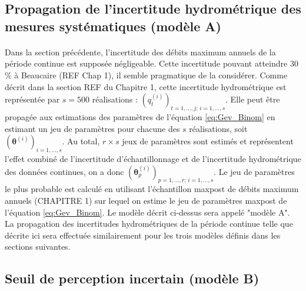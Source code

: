 \documentclass[11pt]{article}
\begin{document}
	

	
	\subsection{Propagation de l'incertitude hydrométrique des mesures systématiques (modèle A)}
	\label{subsec:modA}
	
	\paragraph{}
	Dans la section précédente, l'incertitude des débits maximum annuels de la période continue est supposée négligeable. Cette incertitude pouvant atteindre 30 \% à Beaucaire (REF Chap 1), il semble pragmatique de la considérer. Comme décrit dans la section REF du Chapitre 1, cette incertitude hydrométrique est représentée par $s = 500$ réalisations : $(q_t^{(i)})_{t=1,...,j;\,i=1,...,s}$. Elle peut être propagée aux estimations des paramètres de l'équation \ref{eq:Gev_Binom} en estimant un jeu de paramètres pour chacune des $s$ réalisations, soit $(\boldsymbol{\theta}
	^{(i)})_{i=1,...,s}$. Au total, $r \times s$ jeux de paramètres sont estimés et représentent l'effet combiné de l'incertitude d'échantillonnage et de l'incertitude hydrométrique des données continues, on a donc $(\boldsymbol{\theta}^{(i)}_p)_{p=1,...,r;\, i=1,...,s}$. Le jeu de paramètres le plus probable est calculé en utilisant l'échantillon maxpost de débits maximum annuels (CHAPITRE 1) sur lequel on estime le jeu de paramètres maxpost de l'équation \ref{eq:Gev_Binom}. Le modèle décrit ci-dessus sera appelé "modèle A". La propagation des incertitudes hydrométriques de la période continue telle que décrite ici sera effectuée similairement pour les trois modèles définis dans les sections suivantes.
	
	\subsection{Seuil de perception incertain (modèle B)}
	\label{subsec:modB}
	
\end{document}
